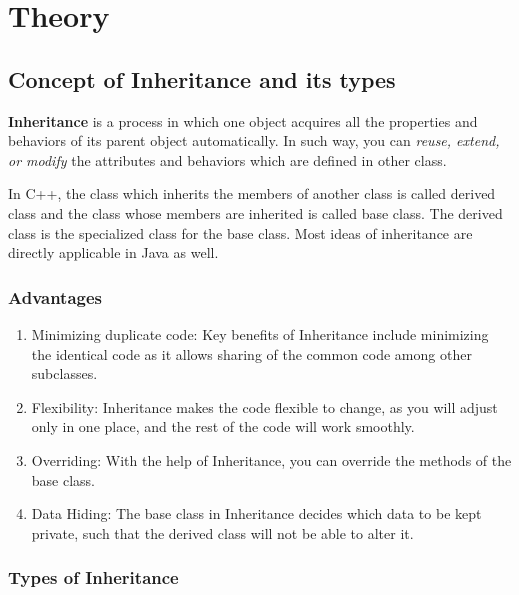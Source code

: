 \documentclass[11pt]{article}
\begin{document}
\section{Theory}

\subsection{Concept of Inheritance and its types}
\textbf{Inheritance} is a process in which one object acquires all the properties and behaviors of its parent object automatically. In such way, you can \textit{reuse, extend, or modify} the attributes and behaviors which are defined in other class.

In C++, the class which inherits the members of another class is called derived class and the class whose members are inherited is called base class. The derived class is the specialized class for the base class. Most ideas of inheritance are directly applicable in Java as well.


\subsubsection{Advantages}
\begin{enumerate}
	\item Minimizing duplicate code: Key benefits of Inheritance include minimizing the identical code as it allows sharing of the common code among other subclasses.

	\item Flexibility: Inheritance makes the code flexible to change, as you will adjust only in one place, and the rest of the code will work smoothly.

	\item Overriding: With the help of Inheritance, you can override the methods of the base class.

	\item Data Hiding: The base class in Inheritance decides which data to be kept private, such that the derived class will not be able to alter it.
\end{enumerate}

\subsubsection{Types of Inheritance}
\end{document}
